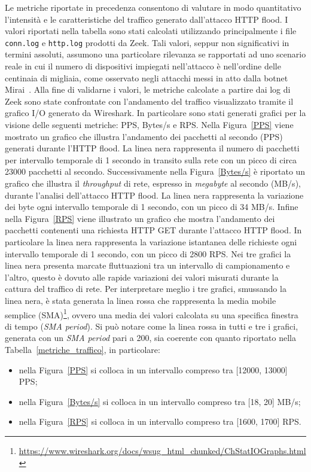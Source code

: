 Le metriche riportate in precedenza consentono di valutare in modo quantitativo l'intensità e le caratteristiche del traffico generato dall'attacco HTTP flood. I valori riportati nella tabella sono stati calcolati utilizzando principalmente i file \texttt{conn.log} e \texttt{http.log} prodotti da Zeek. Tali valori, seppur non significativi in termini assoluti, assumono una particolare rilevanza se rapportati ad uno scenario reale in cui il numero di dispositivi impiegati nell'attacco è nell'ordine delle centinaia di migliaia, come osservato negli attacchi messi in atto dalla botnet Mirai~\cite{info_attacchi_mirai}. Alla fine di validarne i valori, le metriche calcolate a partire dai log di Zeek sono state confrontate con l'andamento del traffico visualizzato tramite il grafico I/O generato da Wireshark. In particolare sono stati generati grafici per la visione delle seguenti metriche: PPS, Bytes/s e RPS. Nella Figura~\ref{PPS} viene mostrato un grafico che illustra l'andamento dei pacchetti al secondo (PPS) generati durante l'HTTP flood. La linea nera rappresenta il numero di pacchetti per intervallo temporale di 1 secondo in transito sulla rete con un picco di circa 23000 pacchetti al secondo. Successivamente nella Figura~\ref{Bytes/s} è riportato un grafico che illustra il \emph{throughput} di rete, espresso in \emph{megabyte} al secondo (MB/s), durante l'analisi dell'attacco HTTP flood. La linea nera rappresenta la variazione dei byte ogni intervallo temporale di 1 secondo, con un picco di 34 MB/s. Infine nella Figura~\ref{RPS} viene illustrato un grafico che mostra l'andamento dei pacchetti contenenti una richiesta HTTP GET durante l'attacco HTTP flood. In particolare la linea nera rappresenta la variazione istantanea delle richieste ogni intervallo temporale di 1 secondo, con un picco di 2800 RPS. Nei tre grafici la linea nera presenta marcate fluttuazioni tra un intervallo di campionamento e l'altro, questo è dovuto alle rapide variazioni dei valori misurati durante la cattura del traffico di rete. Per interpretare meglio i tre grafici, smussando la linea nera, è stata generata la linea rossa che rappresenta la media mobile semplice (SMA)\footnote{\url{https://www.wireshark.org/docs/wsug_html_chunked/ChStatIOGraphs.html}}, ovvero una media dei valori calcolata su una specifica finestra di tempo (\emph{SMA period}).   Si può notare come la linea rossa in tutti e tre i grafici, generata con un \emph{SMA period} pari a 200, sia coerente con quanto riportato nella Tabella~\ref{metriche_traffico}, in particolare:
\begin{itemize}
    \item nella Figura~\ref{PPS} si colloca in un intervallo compreso tra [12000, 13000] PPS;
    \item nella Figura~\ref{Bytes/s} si colloca in un intervallo compreso tra [18, 20] MB/s;
    \item nella Figura~\ref{RPS} si colloca in un intervallo compreso tra [1600, 1700] RPS.
\end{itemize}

